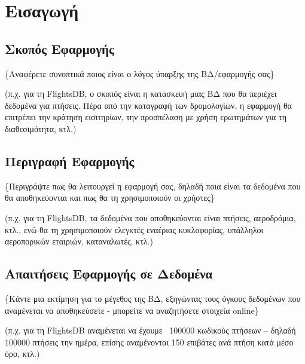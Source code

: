 \section{Εισαγωγή}

\subsection{Σκοπός Εφαρμογής}

\{Αναφέρετε συνοπτικά ποιος είναι ο λόγος ύπαρξης της ΒΔ/εφαρμογής
σας\}

(π.χ. για τη FlightsDB, ο σκοπός είναι η κατασκευή μιας ΒΔ που θα
περιέχει δεδομένα για πτήσεις. Πέρα από την καταγραφή των δρομολογίων,
η εφαρμογή θα επιτρέπει την κράτηση εισιτηρίων, την προσπέλαση με
χρήση ερωτημάτων για τη διαθεσιμότητα, κτλ.)

\subsection{Περιγραφή Εφαρμογής}

\{Περιγράψτε πως θα λειτουργεί η εφαρμογή σας, δηλαδή ποια είναι τα
δεδομένα που θα αποθηκεύονται και πως θα τη χρησιμοποιούν οι χρήστες\}

(π.χ. για τη FlightsDB, τα δεδομένα που αποθηκεύονται είναι πτήσεις,
αεροδρόμια, κτλ., ενώ θα τη χρησιμοποιούν ελεγκτές εναέριας
κυκλοφορίας, υπάλληλοι αεροπορικών εταιριών, καταναλωτές, κτλ.)
\subsection{Απαιτήσεις Εφαρμογής σε Δεδομένα}

\{Κάντε μια εκτίμηση για το μέγεθος της ΒΔ, εξηγώντας τους όγκους
δεδομένων που αναμένεται να αποθηκεύσετε - μπορείτε να αναζητήσετε
στοιχεία online\}

(π.χ. για τη FlightsDB αναμένεται να έχουμε ~100000 κωδικούς πτήσεων –
δηλαδή 100000 πτήσεις την ημέρα, επίσης αναμένονται 150 επιβάτες ανά
πτήση κατά μέσο όρο, κτλ.)


